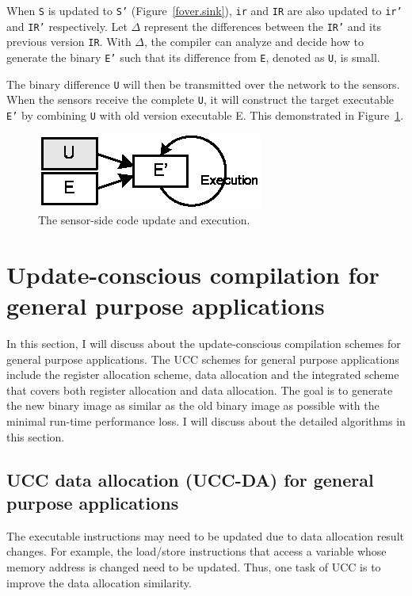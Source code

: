 When {\tt S} is updated to {\tt S'} (Figure~\ref{fover.sink}), {\tt ir} and {\tt IR} are also updated to {\tt ir'} and {\tt IR'} respectively. Let $\Delta$ represent the differences between the {\tt IR'} and its previous version {\tt IR}. With $\Delta$, the compiler can analyze and decide how to generate the binary {\tt E'} such that its difference from {\tt E}, denoted as {\tt U}, is small.

The binary difference {\tt U} will then be transmitted over the network to the sensors. When the sensors receive the complete {\tt U}, it will construct the target executable {\tt E'} by combining {\tt U} with old version executable {E}. This demonstrated in Figure~\ref{fover.sensor}.

\begin{figure}[htp]
\centering
\includegraphics[scale=1]{figures/com_sensor.eps}
\caption{The sensor-side code update and execution.}
\label{fover.sensor}
\end{figure}

\section{Update-conscious compilation for general purpose applications}

In this section, I will discuss about the update-conscious compilation schemes for general purpose applications.
The UCC schemes for general purpose applications include the register allocation scheme, data allocation and
the integrated scheme that covers both register allocation and data allocation.
The goal is to generate the new binary image as similar as the old binary image as possible with the minimal
run-time performance loss. I will discuss about the detailed algorithms in this section.


\subsection{UCC data allocation (UCC-DA) for general purpose applications} 

The executable instructions may need to be updated due to data allocation result changes.
For example, the load/store instructions that access a variable whose memory address is changed
need to be updated.
Thus, one task of UCC is to improve the data allocation similarity.


